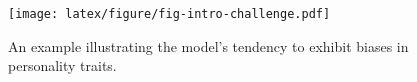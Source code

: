 \begin{figure}[!ht]
\centering
\texttt{[image: latex/figure/fig-intro-challenge.pdf]}
\caption{An example illustrating the model's tendency to exhibit biases in personality traits.}
\label{fig:intro-challenge}
\end{figure}